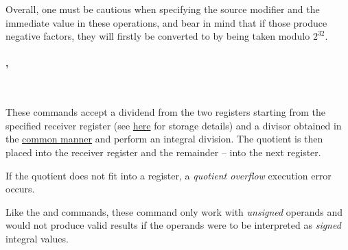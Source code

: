 Overall, one must be cautious when specifying the source modifier and
the immediate value in these operations, and bear in mind that if those produce
negative factors, they will firstly be converted to  by being taken
modulo $2^{32}$.

\vspace{-0.35cm}
\paragraph{, }\

These commands accept a  dividend from the two registers starting
from the specified receiver register (see \hyperlink{types:two_words_storage}{here}
for storage details) and a  divisor obtained in the
\hyperlink{types:twos_complement}{common manner} and perform an integral division.
The quotient is then placed into the receiver register and the remainder -- into
the next register.

If the quotient does not fit into a register, a \textit{quotient overflow}
execution error occurs.

Like the  and  commands, these command only work with
\textit{unsigned} operands and would not produce valid results if the operands
were to be interpreted as \textit{signed} integral values.
